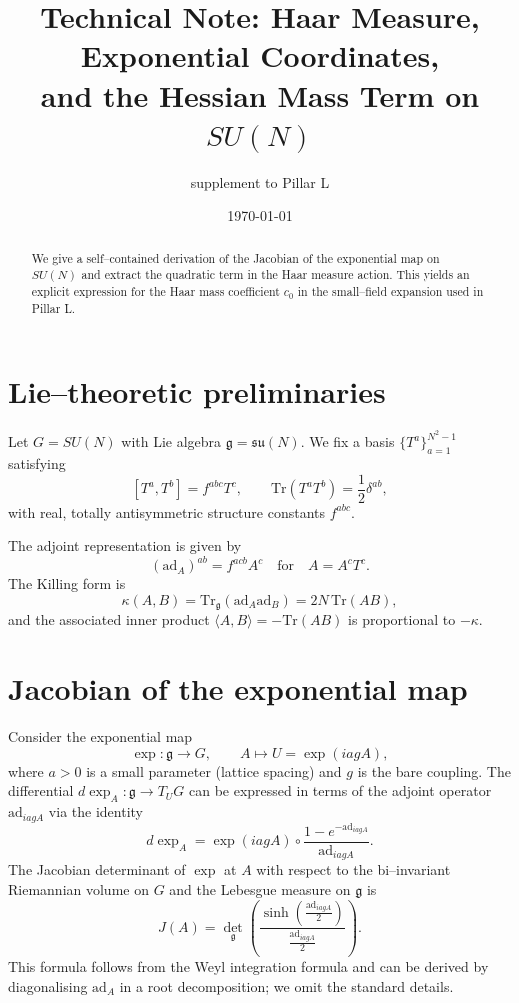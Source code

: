 \documentclass[11pt]{article}
\numberwithin{equation}{section}
\begin{document}
\title{Technical Note: Haar Measure, Exponential Coordinates,\\
and the Hessian Mass Term on $SU(N)$}
\author{supplement to Pillar L}
\date{\today}

\maketitle

\begin{abstract}
We give a self--contained derivation of the Jacobian of the exponential
map on $SU(N)$ and extract the quadratic term in the Haar measure
action.  This yields an explicit expression for the Haar mass
coefficient $c_0$ in the small--field expansion used in Pillar L.
\end{abstract}

\section{Lie--theoretic preliminaries}

Let $G=SU(N)$ with Lie algebra $\mathfrak{g}=\mathfrak{su}(N)$.  We fix
a basis $\{T^a\}_{a=1}^{N^2-1}$ satisfying
\[
  [T^a,T^b] = f^{abc} T^c,\qquad
  \mathrm{Tr}(T^a T^b) = \frac{1}{2}\delta^{ab},
\]
with real, totally antisymmetric structure constants $f^{abc}$.

The adjoint representation is given by
\[
  (\mathrm{ad}_A)^{ab}
  = f^{acb} A^c \quad\text{for}\quad
  A = A^c T^c.
\]
The Killing form is
\[
  \kappa(A,B)
  = \mathrm{Tr}_{\mathfrak{g}}(\mathrm{ad}_A\mathrm{ad}_B)
  = 2N\,\mathrm{Tr}(AB),
\]
and the associated inner product
$\langle A,B\rangle = -\mathrm{Tr}(AB)$ is proportional to $-\kappa$.

\section{Jacobian of the exponential map}

Consider the exponential map
\[
  \exp:\mathfrak{g}\to G,\qquad A\mapsto U=\exp(iagA),
\]
where $a>0$ is a small parameter (lattice spacing) and $g$ is the bare
coupling.  The differential $d\exp_A:\mathfrak{g}\to T_U G$ can be
expressed in terms of the adjoint operator
$\mathrm{ad}_{iagA}$ via the identity
\[
  d\exp_A
  = \exp(iagA)\circ
    \frac{1 - e^{-\mathrm{ad}_{iagA}}}{\mathrm{ad}_{iagA}}.
\]
The Jacobian determinant of $\exp$ at $A$ with respect to the
bi--invariant Riemannian volume on $G$ and the Lebesgue measure on
$\mathfrak{g}$ is
\[
  J(A)
  = \det_{\mathfrak{g}}\!\left(
      \frac{\sinh(\tfrac{\mathrm{ad}_{iagA}}{2})}
           {\tfrac{\mathrm{ad}_{iagA}}{2}}
    \right).
\]
This formula follows from the Weyl integration formula and can be
derived by diagonalising $\mathrm{ad}_A$ in a root decomposition; we
omit the standard details.
\end{document}
